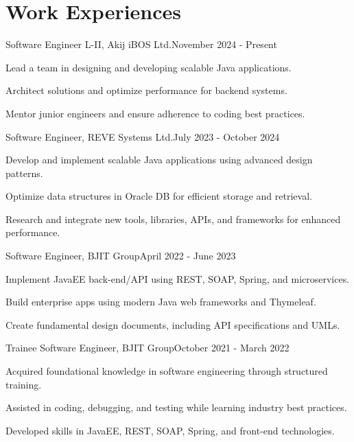 \section{\textbf{Work Experiences}}
\begin{joblong}
{Software Engineer L-II, Akij iBOS Ltd.}{November 2024 - Present}
    \item Lead a team in designing and developing scalable Java applications.
    \item Architect solutions and optimize performance for backend systems.
    \item Mentor junior engineers and ensure adherence to coding best practices.
\end{joblong}

\begin{joblong}
{Software Engineer, REVE Systems Ltd.}{July 2023 - October 2024}
    \item Develop and implement scalable Java applications using advanced design patterns.
    \item Optimize data structures in Oracle DB for efficient storage and retrieval.
    \item Research and integrate new tools, libraries, APIs, and frameworks for enhanced performance.
\end{joblong}

\begin{joblong}
{Software Engineer, BJIT Group}{April 2022 - June 2023}
    \item Implement JavaEE back-end/API using REST, SOAP, Spring, and microservices.
    \item Build enterprise apps using modern Java web frameworks and Thymeleaf.
    \item Create fundamental design documents, including API specifications and UMLs.
\end{joblong}

\begin{joblong}
{Trainee Software Engineer, BJIT Group}{October 2021 - March 2022}
    \item Acquired foundational knowledge in software engineering through structured training.
    \item Assisted in coding, debugging, and testing while learning industry best practices.
    \item Developed skills in JavaEE, REST, SOAP, Spring, and front-end technologies.
\end{joblong}
